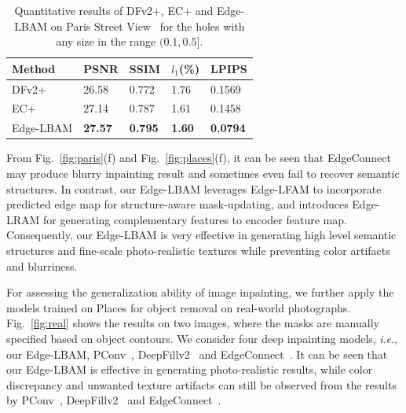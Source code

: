 \documentclass[10pt,journal,compsoc]{IEEEtran}
\newcommand{\ie}{\textit{i}.\textit{e}.}
\begin{document}
\begin{table}[!htbp]
	\scriptsize
	\begin{center}
		\caption{Quantitative results of DFv2+, EC+ and Edge-LBAM on Paris Street View~\cite{doersch2015makes} for the holes with any size in the range $(0.1,0.5]$.}
		\begin{tabular}{p{2.2cm}<{\centering} p{1.1cm}<{\centering} p{1.1cm}<{\centering} p{1.1cm}<{\centering} p{1.1cm}<{\centering}}%
			\toprule
			Method & PSNR &SSIM & $l_1$(\%) & LPIPS \\
			\midrule
			DFv2+ &26.58 & 0.772 & 1.76 & 0.1569 \\
			\midrule
			EC+ &27.14 & 0.787 & 1.61 & 0.1458 \\
			\midrule
			Edge-LBAM & \textbf{27.57} &\textbf{0.795} & \textbf{1.60} & \textbf{0.0794}\\
			\bottomrule
		\end{tabular}
		\label{varaints_of_dfv2}
	\end{center}
\end{table}	
%
From Fig.~\ref{fig:paris}(f) and Fig.~\ref{fig:places}(f), it can be seen that EdgeConnect~\cite{nazeri2019edgeconnect} may produce blurry inpainting result and sometimes even fail to recover semantic structures.
%
In contrast, our Edge-LBAM leverages Edge-LFAM to incorporate predicted edge map for structure-aware mask-updating, and introduces Edge-LRAM for generating complementary features to encoder feature map.
%
Consequently, our Edge-LBAM is very effective in generating high level semantic structures and fine-scale photo-realistic textures while preventing color artifacts and blurriness.

%
%



For assessing the generalization ability of image inpainting, we further apply the models trained on Places for object removal on real-world photographs.
%
Fig.~\ref{fig:real} shows the results on two images, where the masks are manually specified based on object contours.
%
We consider four deep inpainting models, \ie, our Edge-LBAM, PConv~\cite{partialconv2017}, DeepFillv2~\cite{yu2018free} and EdgeConnect~\cite{nazeri2019edgeconnect}.
%
It can be seen that our Edge-LBAM is effective in generating photo-realistic results, while color discrepancy and unwanted texture artifacts can still be observed from the results by PConv~\cite{partialconv2017}, DeepFillv2~\cite{yu2018free} and EdgeConnect~\cite{nazeri2019edgeconnect}.
\end{document}
